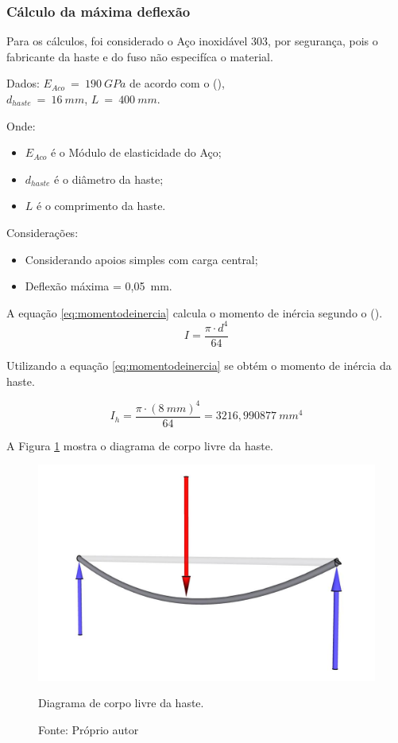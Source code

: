 \subsubsection{Cálculo da máxima deflexão}

Para os cálculos, foi considerado o Aço inoxidável 303, por segurança, pois o fabricante da haste e do fuso 
não especifíca o material.

Dados: 
$E_{Aco}~=~190~GPa$ de acordo com o \citeauthor{juvinall2020fundamentals} (\citeyear{juvinall2020fundamentals}),\\
$d_{haste}~=~16~mm$, $L~=~400~mm$.

Onde:
\begin{itemize}
    \item $E_{Aco}$ é o Módulo de elasticidade do Aço;
    \item $d_{haste}$ é o diâmetro da haste;
    \item $L$ é o comprimento da haste.
\end{itemize}

Considerações:
\begin{itemize}
    \item Considerando apoios simples com carga central;
    \item Deflexão máxima = 0,05~mm.
\end{itemize}

A equação \ref{eq:momentodeinercia} calcula o momento de inércia segundo o \citeauthor{juvinall2020fundamentals} (\citeyear{juvinall2020fundamentals}).
\begin{equation}\label{eq:momentodeinercia}
    I = \frac{\pi \cdot d^{4}}{64}
\end{equation}

Utilizando a equação \ref{eq:momentodeinercia} se obtém o momento de inércia da haste.

$$I_{h} = \frac{\pi \cdot (8~mm)^{4}}{64} = 3216,990877~mm^{4}$$   

A Figura \ref{fig:diagramacorpolivre} mostra o diagrama de corpo livre da haste.

\begin{figure}[H]
\centering
\includegraphics[scale = 0.4]{figuras/diagramcorpolivre}
\caption{Diagrama de corpo livre da haste.}
\caption*{Fonte: Próprio autor}
\label{fig:diagramacorpolivre}
\end{figure}

